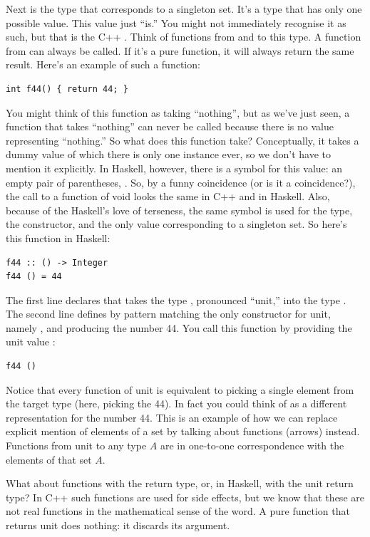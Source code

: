 Next is the type that corresponds to a singleton set. It's a type that
has only one possible value. This value just ``is.'' You might not
immediately recognise it as such, but that is the C++ .
Think of functions from and to this type. A function from 
can always be called. If it's a pure function, it will always return the
same result. Here's an example of such a function:

\begin{Verbatim}
int f44() { return 44; }
\end{Verbatim}
You might think of this function as taking ``nothing'', but as we've
just seen, a function that takes ``nothing'' can never be called because
there is no value representing ``nothing.'' So what does this function
take? Conceptually, it takes a dummy value of which there is only one
instance ever, so we don't have to mention it explicitly. In Haskell,
however, there is a symbol for this value: an empty pair of parentheses,
\code{()}. So, by a funny coincidence (or is it a coincidence?), the
call to a function of void looks the same in C++ and in Haskell. Also,
because of the Haskell's love of terseness, the same symbol \code{()}
is used for the type, the constructor, and the only value corresponding
to a singleton set. So here's this function in Haskell:

\begin{Verbatim}
f44 :: () -> Integer
f44 () = 44
\end{Verbatim}
The first line declares that  takes the type \code{()},
pronounced ``unit,'' into the type . The second line
defines  by pattern matching the only constructor for unit,
namely \code{()}, and producing the number 44. You call this function
by providing the unit value \code{()}:

\begin{Verbatim}
f44 ()
\end{Verbatim}
Notice that every function of unit is equivalent to picking a single
element from the target type (here, picking the  44). In
fact you could think of  as a different representation for
the number 44. This is an example of how we can replace explicit mention
of elements of a set by talking about functions (arrows) instead.
Functions from unit to any type $A$ are in one-to-one correspondence with
the elements of that set $A$.

What about functions with the  return type, or, in Haskell,
with the unit return type? In C++ such functions are used for side
effects, but we know that these are not real functions in the
mathematical sense of the word. A pure function that returns unit does
nothing: it discards its argument.

